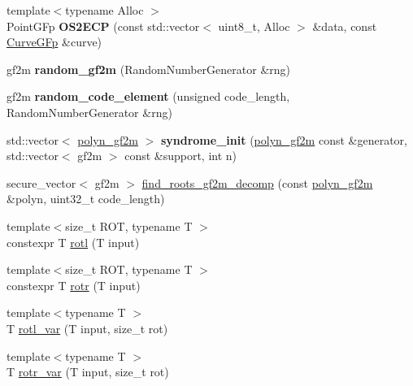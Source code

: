 \begin{DoxyCompactItemize}
\item 
\mbox{\label{namespace_botan_a05d9540ebd0f083ea462cccfd0c095a4}} 
{\footnotesize template$<$typename Alloc $>$ }\\Point\+G\+Fp {\bfseries O\+S2\+E\+CP} (const std\+::vector$<$ uint8\+\_\+t, Alloc $>$ \&data, const \hyperlink{class_botan_1_1_curve_g_fp}{Curve\+G\+Fp} \&curve)
\item 
\mbox{\label{namespace_botan_a8dfd25b09667ccc4f9fc801ff2577d46}} 
gf2m {\bfseries random\+\_\+gf2m} (Random\+Number\+Generator \&rng)
\item 
\mbox{\label{namespace_botan_adb7b7c44821bc546a8d4ae730966c89e}} 
gf2m {\bfseries random\+\_\+code\+\_\+element} (unsigned code\+\_\+length, Random\+Number\+Generator \&rng)
\item 
\mbox{\label{namespace_botan_af508fa604237b84434f5cc4e3eb39e2f}} 
std\+::vector$<$ \hyperlink{class_botan_1_1polyn__gf2m}{polyn\+\_\+gf2m} $>$ {\bfseries syndrome\+\_\+init} (\hyperlink{class_botan_1_1polyn__gf2m}{polyn\+\_\+gf2m} const \&generator, std\+::vector$<$ gf2m $>$ const \&support, int n)
\item 
secure\+\_\+vector$<$ gf2m $>$ \hyperlink{namespace_botan_ab09a4986d871198f0b07c181de40cf51}{find\+\_\+roots\+\_\+gf2m\+\_\+decomp} (const \hyperlink{class_botan_1_1polyn__gf2m}{polyn\+\_\+gf2m} \&polyn, uint32\+\_\+t code\+\_\+length)
\item 
{\footnotesize template$<$size\+\_\+t R\+OT, typename T $>$ }\\constexpr T \hyperlink{namespace_botan_a08a31a219cbddcbfcb2f6fc770fcaed4}{rotl} (T input)
\item 
{\footnotesize template$<$size\+\_\+t R\+OT, typename T $>$ }\\constexpr T \hyperlink{namespace_botan_ada30f39e9838317878d9da1e095bdfe8}{rotr} (T input)
\item 
{\footnotesize template$<$typename T $>$ }\\T \hyperlink{namespace_botan_a2e3ac5eb5fe20890242666142e72a8f6}{rotl\+\_\+var} (T input, size\+\_\+t rot)
\item 
{\footnotesize template$<$typename T $>$ }\\T \hyperlink{namespace_botan_ae58d929c7e8f311bc908091212d969dd}{rotr\+\_\+var} (T input, size\+\_\+t rot)

\end{DoxyCompactItemize}
